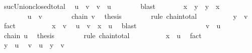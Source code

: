 \begin{isabellebody}
\ suc{\isacharunderscore}{\kern0pt}Union{\isacharunderscore}{\kern0pt}closed{\isacharunderscore}{\kern0pt}total\ \isamarkupfalse%
\ {\isachardoublequoteopen}u\ {\isasymsubseteq}\ v\ {\isasymor}\ v\ {\isasymsubseteq}\ u{\isachardoublequoteclose}\isanewline
\ \ \ \ \ \ \isamarkupfalse%
\ blast\isanewline
\ \ \ \ \isamarkupfalse%
\ \isamarkupfalse%
\ {\isachardoublequoteopen}x\ {\isasymsqsubseteq}\ y\ {\isasymor}\ y\ {\isasymsqsubseteq}\ x{\isachardoublequoteclose}\isanewline
\ \ \ \ \isamarkupfalse%
\isanewline
\ \ \ \ \ \ \isamarkupfalse%
\ {\isachardoublequoteopen}u\ {\isasymsubseteq}\ v{\isachardoublequoteclose}\isanewline
\ \ \ \ \ \ \isamarkupfalse%
\ {\isacartoucheopen}chain\ v{\isacartoucheclose}\ \isamarkupfalse%
\ {\isacharquery}{\kern0pt}thesis\isanewline
\ \ \ \ \ \ \isamarkupfalse%
\ {\isacharparenleft}{\kern0pt}rule\ chain{\isacharunderscore}{\kern0pt}total{\isacharparenright}{\kern0pt}\isanewline
\ \ \ \ \ \ \ \ \isamarkupfalse%
\ {\isachardoublequoteopen}y\ {\isasymin}\ v{\isachardoublequoteclose}\ \isamarkupfalse%
\ fact\isanewline
\ \ \ \ \ \ \ \ \isamarkupfalse%
\ {\isachardoublequoteopen}x\ {\isasymin}\ v{\isachardoublequoteclose}\ \isamarkupfalse%
\ {\isacartoucheopen}u\ {\isasymsubseteq}\ v{\isacartoucheclose}\ \ {\isacartoucheopen}x\ {\isasymin}\ u{\isacartoucheclose}\ \isamarkupfalse%
\ blast\isanewline
\ \ \ \ \ \ \isamarkupfalse%
\isanewline
\ \ \ \ \isamarkupfalse%
\isanewline
\ \ \ \ \ \ \isamarkupfalse%
\ {\isachardoublequoteopen}v\ {\isasymsubseteq}\ u{\isachardoublequoteclose}\isanewline
\ \ \ \ \ \ \isamarkupfalse%
\ {\isacartoucheopen}chain\ u{\isacartoucheclose}\ \isamarkupfalse%
\ {\isacharquery}{\kern0pt}thesis\isanewline
\ \ \ \ \ \ \isamarkupfalse%
\ {\isacharparenleft}{\kern0pt}rule\ chain{\isacharunderscore}{\kern0pt}total{\isacharparenright}{\kern0pt}\isanewline
\ \ \ \ \ \ \ \ \isamarkupfalse%
\ {\isachardoublequoteopen}x\ {\isasymin}\ u{\isachardoublequoteclose}\ \isamarkupfalse%
\ fact\isanewline
\ \ \ \ \ \ \ \ \isamarkupfalse%
\ {\isachardoublequoteopen}y\ {\isasymin}\ u{\isachardoublequoteclose}\ \isamarkupfalse%
\ {\isacartoucheopen}v\ {\isasymsubseteq}\ u{\isacartoucheclose}\ \ {\isacartoucheopen}y\ {\isasymin}\ v{\isacartoucheclose}\ \isamarkupfalse%

\end{isabellebody}

